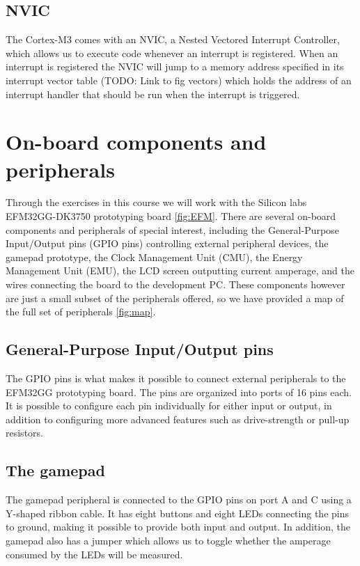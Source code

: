 \subsection{NVIC}
The Cortex-M3 comes with an NVIC, a Nested Vectored Interrupt Controller, which allows us to execute code whenever an interrupt is registered. When an interrupt is registered the NVIC will jump to a memory address specified in its interrupt vector table (TODO: Link to fig vectors) which holds the address of an interrupt handler that should be run when the interrupt is triggered.\cite{compendium}

\section{On-board components and peripherals}

Through the exercises in this course we will work with the  Silicon labs EFM32GG-DK3750 prototyping board \ref{fig:EFM}. There are several on-board components and peripherals of special interest, including the General-Purpose Input/Output pins (GPIO pins) controlling external peripheral devices, the gamepad prototype, the Clock Management Unit (CMU), the Energy Management Unit (EMU), the LCD screen outputting current amperage, and the wires connecting the board to the development PC. These components however are just a small subset of the peripherals offered, so we have provided a map of the full set of peripherals \ref{fig:map}.

\subsection{General-Purpose Input/Output pins}
The GPIO pins is what makes it possible to connect external peripherals to the EFM32GG prototyping board. The pins are organized into ports of 16 pins each. It is possible to configure each pin individually for either input or output, in addition to configuring more advanced features such as drive-strength or pull-up resistors.

\subsection{The gamepad}
The gamepad peripheral is connected to the GPIO pins on port A and C using a Y-shaped ribbon cable. It has eight buttons and eight LEDs connecting the pins to ground, making it possible to provide both input and output. In addition, the gamepad also has a jumper which allows us to toggle whether the amperage consumed by the LEDs will be measured.

